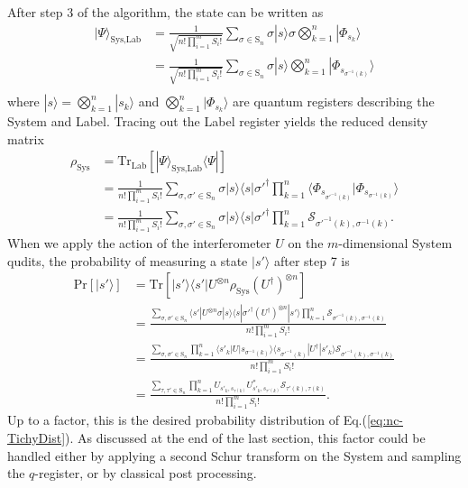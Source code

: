 After step 3 of the algorithm, the state can be written as
\begin{align}
|\Psi\rangle_{\textrm{Sys,Lab}}
 &= \frac{1}{\sqrt{n!\prod_{i=1}^m S_i!}}\sum_{\sigma\in\textrm{S}_n}\sigma|s\rangle\sigma\bigotimes_{k=1}^n|\Phi_{s_k}\rangle\\
 &= \frac{1}{\sqrt{n!\prod_{i=1}^m S_i!}}\sum_{\sigma\in\textrm{S}_n}\sigma|s\rangle\bigotimes_{k=1}^n|\Phi_{s_{\sigma^{-1}(k)}}\rangle\\
\end{align}
where $|s\rangle=\bigotimes_{k=1}^n|s_k\rangle$ and $\bigotimes_{k=1}^n|\Phi_{s_k}\rangle$ are quantum registers describing the System and Label. 
Tracing out the Label register yields the reduced density matrix
\begin{align}
\rho_{\textrm{Sys}}
 &= \textrm{Tr}_{\textrm{Lab}}[|\Psi\rangle_{\textrm{Sys,Lab}}\langle\Psi|]\\
 &= \frac{1}{n!\prod_{i=1}^m S_i!}\sum_{\sigma,\sigma'\in\textrm{S}_n}\sigma|s\rangle\langle s|\sigma'^\dagger \prod_{k=1}^n \langle\Phi_{s_{\sigma'^{-1}(k)}}|\Phi_{s_{\sigma^{-1}(k)}}\rangle\\
 &=\frac{1}{n!\prod_{i=1}^m S_i!}\sum_{\sigma,\sigma'\in\textrm{S}_n}\sigma|s\rangle\langle s|\sigma'^\dagger \prod_{k=1}^n \mathcal{S}_{\sigma'^{-1}(k),\sigma^{-1}(k)}.
\end{align}
When we apply the action of the interferometer $U$ on the $m$-dimensional System qudits, the probability of measuring a state $|s'\rangle$ after step 7 is
\begin{align}
\textrm{Pr}[|s'\rangle] 
 &= \textrm{Tr}[|s'\rangle\langle s'|U^{\otimes n}\rho_{\textrm{Sys}}(U^\dagger)^{\otimes n}]\\
 &= \frac{\sum_{\sigma, \sigma' \in \textrm{S}_n}\langle s'|U^{\otimes n}\sigma|s\rangle\langle s|\sigma'^\dagger(U^\dagger)^{\otimes n}|s'\rangle \prod_{k=1}^n\mathcal{S}_{\sigma'^{-1}(k),\sigma^{-1}(k)}}{n!\prod_{i=1}^m S_i!}\\
 &= \frac{\sum_{\sigma, \sigma' \in \textrm{S}_n} \prod_{k=1}^n \langle s'_k|U|s_{\sigma^{-1}(k)}\rangle\langle s_{\sigma'^{-1}(k)}|U^\dagger|s'_k\rangle\mathcal{S}_{\sigma'^{-1}(k),\sigma^{-1}(k)}}{n!\prod_{i=1}^m S_i!}\\
 &= \frac{\sum_{\tau, \tau' \in \textrm{S}_n} \prod_{k=1}^n U_{s'_k,s_{\tau(k)}} U^*_{s'_k,s_{\tau'(k)}} \mathcal{S}_{\tau'(k),\tau(k)}}{n!\prod_{i=1}^m S_i!}.
\end{align}
Up to a factor, this is the desired probability distribution of Eq.(\ref{eq:nc-TichyDist}).
As discussed at the end of the last section, this factor could be handled either by applying a second Schur transform on the System and sampling the $q$-register, or by classical post processing.

